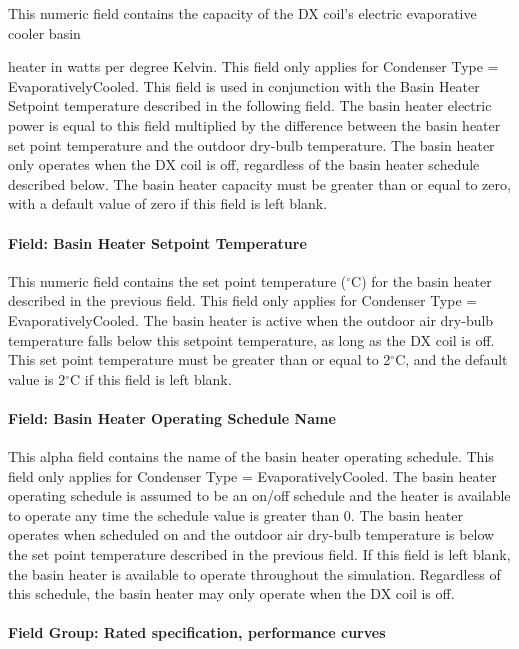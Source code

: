 This numeric field contains the capacity of the DX coil's electric evaporative cooler basin

heater in watts per degree Kelvin. This field only applies for Condenser Type = EvaporativelyCooled. This field is used in conjunction with the Basin Heater Setpoint temperature described in the following field. The basin heater electric power is equal to this field multiplied by the difference between the basin heater set point temperature and the outdoor dry-bulb temperature. The basin heater only operates when the DX coil is off, regardless of the basin heater schedule described below. The basin heater capacity must be greater than or equal to zero, with a default value of zero if this field is left blank.

\paragraph{Field: Basin Heater Setpoint Temperature}\label{field-basin-heater-setpoint-temperature-4}

This numeric field contains the set point temperature ($^\circ$C) for the basin heater described in the previous field. This field only applies for Condenser Type = EvaporativelyCooled. The basin heater is active when the outdoor air dry-bulb temperature falls below this setpoint temperature, as long as the DX coil is off. This set point temperature must be greater than or equal to 2$^\circ$C, and the default value is 2$^\circ$C if this field is left blank.

\paragraph{Field: Basin Heater Operating Schedule Name}\label{field-basin-heater-operating-schedule-name-4}

This alpha field contains the name of the basin heater operating schedule. This field only applies for Condenser Type = EvaporativelyCooled. The basin heater operating schedule is assumed to be an on/off schedule and the heater is available to operate any time the schedule value is greater than 0. The basin heater operates when scheduled on and the outdoor air dry-bulb temperature is below the set point temperature described in the previous field. If this field is left blank, the basin heater is available to operate throughout the simulation. Regardless of this schedule, the basin heater may only operate when the DX coil is off.

\paragraph{Field Group: Rated specification, performance curves}\label{field-group-rated-specification-performance-curves}

